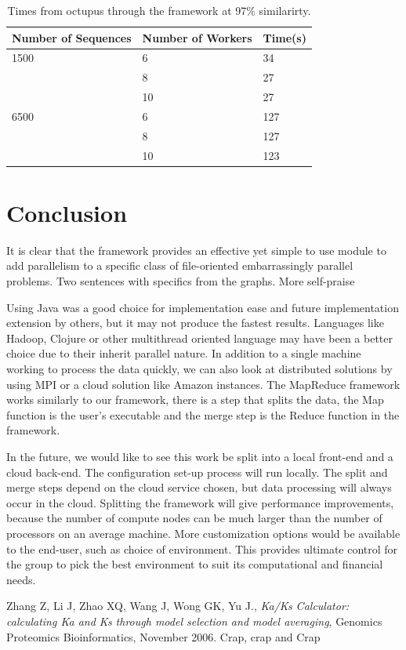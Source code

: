 \documentclass[12pt]{article}
\begin{document}
\begin{table}
    \begin{center}
    \begin{tabular}{|l|l|l|}
        \hline
        Number of Sequences & Number of Workers & Time(s) \\ \hline
        1500                & 6                 & 34      \\
        ~                   & 8                 & 27      \\
        ~                   & 10                & 27      \\ \hline
        6500                & 6                 & 127     \\
        ~                   & 8                 & 127     \\
        ~                   & 10                & 123     \\ \hline
    \end{tabular}
    \caption{Times from octupus through the framework at 97\% similarirty.}
    \end{center}
    \label{tab:octu2}
\end{table}

\section{Conclusion}

It is clear that the framework provides an effective yet simple to use module to
add parallelism to a specific class of file-oriented embarrassingly parallel
problems. Two sentences with specifics from the graphs. More self-praise 

Using Java was a good choice for implementation ease and future implementation
extension by others, but it may not produce the fastest results. Languages like
Hadoop, Clojure or other multithread oriented language may have been a better
choice due to their inherit parallel nature. In addition to a single machine
working to process the data quickly, we can also look at distributed solutions
by using MPI or a cloud solution like Amazon instances. The MapReduce framework
works similarly to our framework, there is a step that splits the data, the Map
function is the user's executable and the merge step is the Reduce function in
the framework. 

In the future, we would like to see this work be split into a local front-end
and a cloud back-end. The configuration set-up process will run locally. The
split and merge steps depend on the cloud service chosen, but data processing
will always occur in the cloud. Splitting the framework will give performance
improvements, because the number of compute nodes can be much larger than the
number of processors on an average machine. More customization options would be
available to the end-user, such as choice of environment. This provides ultimate
control for the group to pick the best environment to suit its computational and
financial needs.

\begin{thebibliography}{1}
Zhang Z, Li J, Zhao XQ, Wang J, Wong GK, Yu J., \emph{Ka/Ks Calculator: 
calculating Ka and Ks through model selection and model averaging},
Genomics Proteomics Bioinformatics, November 2006.
Crap, crap and Crap
\end{thebibliography}
\end{document}
